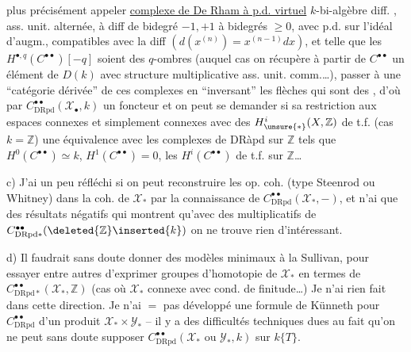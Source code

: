 plus précisément appeler \uline{complexe de De Rham à p.d. virtuel}   $k$-bi-algèbre diff. , ass. unit. alternée, à diff de bidegré $-1,+1$  à bidegrés $\geq 0$, avec p.d. sur l'idéal d'augm., compatibles avec la diff $(d(x^{(n)})=x^{(n-1)}dx)$, et telle que les $H^{\bullet,q}(C^{\bullet\bullet})[-q]$ soient des $q$-ombres (auquel cas on récupère à partir de $C^{\bullet\bullet}$ un élément de $D(k)$ avec structure multiplicative ass. unit. comm.\dots), passer à une ``catégorie dérivée'' de ces complexes en ``inversant'' les flèches qui sont des , d'où par $C^{\bullet\bullet}_{\mathrm{DRpd}}(\mathcal X_\bullet,k)$ un foncteur
et on peut se demander si sa restriction aux espaces connexes et simplement connexes avec des $H^i_{\unsure{*}}(X,\mathbb Z)$ de t.f. (cas $k=\mathbb Z$)   une équivalence avec les complexes de DRàpd sur $\mathbb Z$ tels que $H^0(C^{\bullet\bullet})\simeq k$, $H^1(C^{\bullet\bullet})=0$, les $H^i(C^{\bullet\bullet})$ de t.f. sur $\mathbb Z$\dots


c) J'ai un peu réfléchi  si on peut reconstruire les op. coh.  (type Steenrod ou Whitney) dans la coh. de $\mathcal X_*$ par la connaissance de $C^{\bullet\bullet}_{\mathrm{DRpd}}(\mathcal X_*,-)$, et n'ai que des résultats  négatifs qui montrent qu'avec des  multiplicatifs de $C^{\bullet\bullet}_{\mathrm{DRpd}*}(\deleted{\mathbb Z}\inserted{k})$ on ne trouve rien d'intéressant.

d) Il faudrait sans doute donner des modèles minimaux à la Sullivan, pour essayer entre autres d'exprimer  groupes d'homotopie de $\mathcal X_*$ en termes de $C^{\bullet\bullet}_{\mathrm{DRpd}*}(\mathcal X_*,\mathbb Z)$ (cas où $\mathcal X_*$  connexe avec cond. de finitude\dots) Je n'ai rien fait dans cette direction. Je n'ai $=$ pas développé une formule de Künneth pour $C^{\bullet\bullet}_{\mathrm{DRpd}}$ d'un produit $\mathcal X_*\times\mathcal Y_*$ -- il y a des difficultés techniques dues au fait qu'on ne peut sans doute supposer $C^{\bullet\bullet}_{\mathrm{DRpd}}(\mathcal X_*\text{ ou }\mathcal Y_*,k)$  sur $k\{T\}$.

